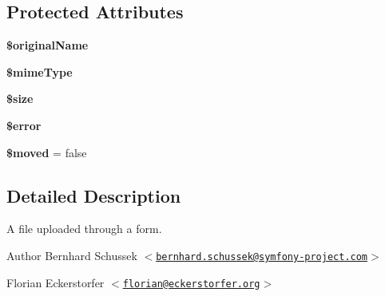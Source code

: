 \subsection*{\-Protected \-Attributes}
\begin{DoxyCompactItemize}
\item 
\hypertarget{class_symfony_1_1_component_1_1_http_foundation_1_1_file_1_1_uploaded_file_ab81f0c5a4c611f24bba0375b91721153}{
{\bfseries \$original\-Name}}
\label{class_symfony_1_1_component_1_1_http_foundation_1_1_file_1_1_uploaded_file_ab81f0c5a4c611f24bba0375b91721153}

\item 
\hypertarget{class_symfony_1_1_component_1_1_http_foundation_1_1_file_1_1_uploaded_file_acfce3426adc678c3e98219378516040e}{
{\bfseries \$mime\-Type}}
\label{class_symfony_1_1_component_1_1_http_foundation_1_1_file_1_1_uploaded_file_acfce3426adc678c3e98219378516040e}

\item 
\hypertarget{class_symfony_1_1_component_1_1_http_foundation_1_1_file_1_1_uploaded_file_af594986e4618a8d6a5d7566617f583c6}{
{\bfseries \$size}}
\label{class_symfony_1_1_component_1_1_http_foundation_1_1_file_1_1_uploaded_file_af594986e4618a8d6a5d7566617f583c6}

\item 
\hypertarget{class_symfony_1_1_component_1_1_http_foundation_1_1_file_1_1_uploaded_file_aeba2ab722cedda53dbb7ec1a59f45550}{
{\bfseries \$error}}
\label{class_symfony_1_1_component_1_1_http_foundation_1_1_file_1_1_uploaded_file_aeba2ab722cedda53dbb7ec1a59f45550}

\item 
\hypertarget{class_symfony_1_1_component_1_1_http_foundation_1_1_file_1_1_uploaded_file_a6ce87f748d1f577f323acf1e0a2ae41e}{
{\bfseries \$moved} = false}
\label{class_symfony_1_1_component_1_1_http_foundation_1_1_file_1_1_uploaded_file_a6ce87f748d1f577f323acf1e0a2ae41e}

\end{DoxyCompactItemize}


\subsection{\-Detailed \-Description}
\-A file uploaded through a form.

\begin{DoxyAuthor}{\-Author}
\-Bernhard \-Schussek $<$\href{mailto:bernhard.schussek@symfony-project.com}{\tt bernhard.\-schussek@symfony-\/project.\-com}$>$ 

\-Florian \-Eckerstorfer $<$\href{mailto:florian@eckerstorfer.org}{\tt florian@eckerstorfer.\-org}$>$ 
\end{DoxyAuthor}



